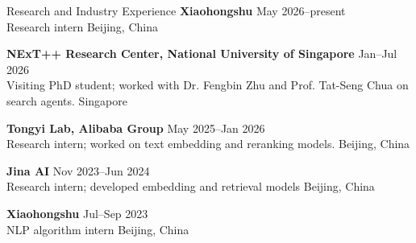 \documentclass{resume}
\begin{document}
\begin{rSection}{Research and Industry Experience}
\textbf{Xiaohongshu} \hfill May 2026--present \\
Research intern \hfill Beijing, China

\textbf{NExT++ Research Center, National University of Singapore} \hfill Jan--Jul 2026 \\
Visiting PhD student; worked with Dr. Fengbin Zhu and Prof. Tat-Seng Chua on search agents. \hfill Singapore

\textbf{Tongyi Lab, Alibaba Group} \hfill May 2025--Jan 2026 \\
Research intern; worked on text embedding and reranking models. \hfill Beijing, China

\textbf{Jina AI} \hfill Nov 2023--Jun 2024 \\
Research intern; developed embedding and retrieval models \hfill Beijing, China

\textbf{Xiaohongshu} \hfill Jul--Sep 2023 \\
NLP algorithm intern \hfill Beijing, China
\end{rSection}
\end{document}
